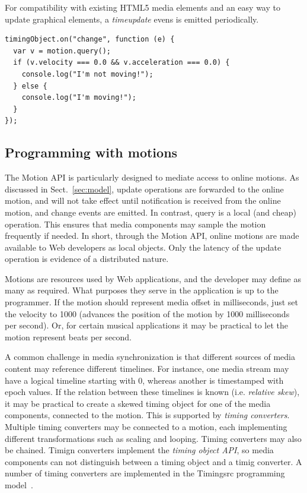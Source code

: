 
For compatibility with existing HTML5 media elements and an easy way to update graphical elements, a \emph{timeupdate} evens is emitted periodically.

\begin{lstlisting}[caption=Monitoring changes to the motion through the change event.]
timingObject.on("change", function (e) {
  var v = motion.query();
  if (v.velocity === 0.0 && v.acceleration === 0.0) {
    console.log("I'm not moving!");
  } else {
    console.log("I'm moving!");
  }
});
\end{lstlisting}


\subsection{Programming with motions}


The Motion API is particularly designed to mediate access to online motions.
As discussed in Sect.~\ref{sec:model}, update operations are forwarded to the
online motion, and will not take effect until notification is received from
the online motion, and change events are emitted. In contrast, query is a local
(and cheap) operation. This ensures that media components may sample the
motion frequently if needed. In short, through the Motion API, online motions
are made available to Web developers as local objects. Only the latency of the
update operation is evidence of a distributed nature.


Motions are resources used by Web applications, and the developer may define
as many as required. What purposes they serve in the application is up to the
programmer. If the motion should represent media offset in milliseconds, just
set the velocity to 1000 (advances the position of the motion by 1000
milliseconds per second). Or, for certain musical applications it may be
practical to let the motion represent beats per second.


A common challenge in media synchronization is that different sources of media
content may reference different timelines. For instance, one media stream may
have a logical timeline starting with 0, whereas another is timestamped with
epoch values. If the relation between these timelines is known (i.e.
\emph{relative skew}), it may be practical to create a skewed timing object
for one of the media components, connected to the motion. This is supported by
\emph{timing converters}. Multiple timing converters may be connected to a
motion, each implementing different transformations such as scaling and
looping. Timing converters may also be chained. Timign converters implement
the \emph{timing object API}, so media components can not distinguish between
a timing object and a timig converter. A number of timing converters are
implemented in the Timingsrc programming model~\cite{timingsrc}.

